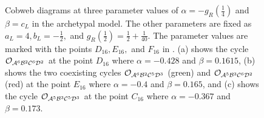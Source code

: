 \begin{figure}
	\centering
	\caption[Cobweb diagrams of the archetypal model]{
		Cobweb diagrams at three parameter values of $\alpha = -g_R\left(\frac{1}{4}\right)$ and $\beta = c_L$ in the archetypal model.
		The other parameters are fixed as $a_L = 4, b_L = -\frac{1}{2},$ and $g_R\left(\frac{1}{2}\right) = \frac{1}{2} + \frac{1}{40}$.
		The parameter values are marked with the points $D_{16}, E_{16},$ and $F_{16}$ in .
		(a) shows the cycle $\mathcal{O}_{\mathcal{A}^6\mathcal{B}^2\mathcal{C}^6\mathcal{D}^2}$ at the point $D_{16}$ where $\alpha = -0.428$ and $\beta = 0.1615$,
		(b) shows the two coexisting cycles $\mathcal{O}_{\mathcal{A}^6\mathcal{B}^2\mathcal{C}^5\mathcal{D}^3}$ (green) and $\mathcal{O}_{\mathcal{A}^5\mathcal{B}^3\mathcal{C}^6\mathcal{D}^2}$ (red) at the point $E_{16}$ where $\alpha = -0.4$ and $\beta = 0.165$,
		and (c) shows the cycle $\mathcal{O}_{\mathcal{A}^5\mathcal{B}^3\mathcal{C}^5\mathcal{D}^3}$ at the point $C_{16}$ where $\alpha = -0.367$ and $\beta = 0.173$.
	}
	\label{fig:arch.dyn.cobwebs.2}
\end{figure}

